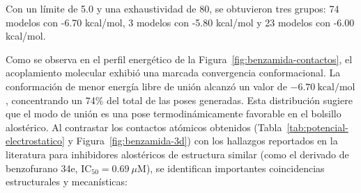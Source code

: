 Con un límite de 5.0 y una exhaustividad de 80, se obtuvieron tres grupos: 74 modelos con -6.70 kcal/mol, 3 modelos con -5.80 kcal/mol y 23 modelos con -6.00 kcal/mol. 

Como se observa en el perfil energético de la Figura~\ref{fig:benzamida-contactos}, el acoplamiento molecular exhibió una marcada convergencia conformacional. La conformación de menor energía libre de unión alcanzó un valor de $-6.70\ \text{kcal/mol}$, concentrando un 74\% del total de las poses generadas. Esta distribución sugiere que el modo de unión es una pose termodinámicamente favorable en el bolsillo alostérico.
Al contrastar los contactos atómicos obtenidos (Tabla~\ref{tab:potencial-electrostatico} y Figura~\ref{fig:benzamida-3d}) con los hallazgos reportados en la literatura para inhibidores alostéricos de estructura similar (como el derivado de benzofurano 34e, $\text{IC}_{50} = 0.69\ \mu\text{M}$), se identifican importantes coincidencias estructurales y mecanísticas:

